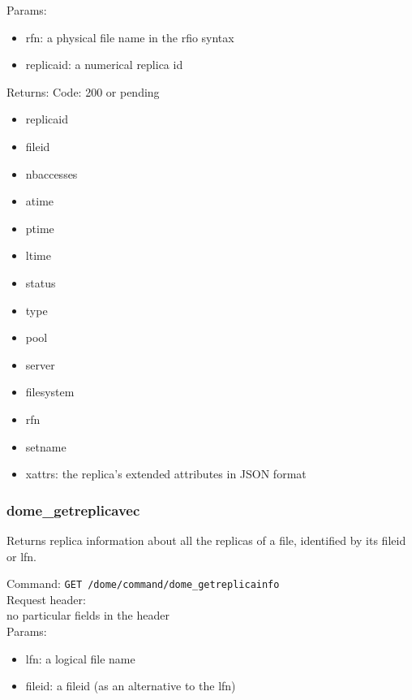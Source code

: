 \documentclass[a4paper,10pt]{scrreprt}
\begin{document}
Params:
\begin{itemize}
 \item rfn: a physical file name in the rfio syntax
 \item replicaid: a numerical replica id
\end{itemize}

Returns:
Code: 200 or pending
\begin{itemize}

 \item replicaid
 \item fileid
 \item nbaccesses
 \item atime
 \item ptime
 \item ltime
 \item status
 \item type
 \item pool
 \item server
 \item filesystem
 \item rfn
 \item setname
 \item xattrs: the replica's extended attributes in JSON format
\end{itemize}



\subsubsection{dome\_getreplicavec}
Returns replica information about all the replicas of a file, identified by its fileid or lfn.

Command:
\lstinline"GET /dome/command/dome_getreplicainfo"\\

Request header:\\
no particular fields in the header\\

Params:
\begin{itemize}
 \item lfn: a logical file name
 \item fileid: a fileid (as an alternative to the lfn)
\end{itemize}
\end{document}

